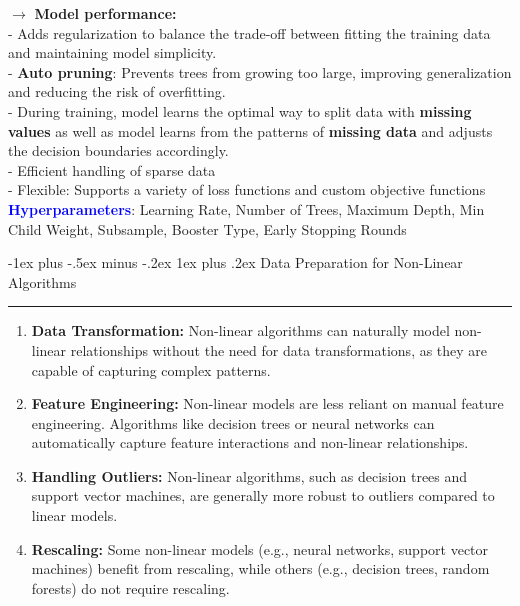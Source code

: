 \documentclass[letterpaper, 10.5pt,landscape]{article}
\makeatletter
\renewcommand{\subsubsection}{\@startsection{subsubsection}{3}{0mm}%
                                {-1ex plus -.5ex minus -.2ex}%
                                {1ex plus .2ex}%
                                {\normalfont\small\bfseries}}
\makeatother
\begin{document}
\begin{multicols*}{3}
$\rightarrow$ \textbf{Model performance: }  \\
\hspace{8pt}- Adds regularization to balance the trade-off between fitting the training data and maintaining model simplicity. \\
\hspace{8pt}- \textbf{Auto pruning}: Prevents trees from growing too large, improving generalization and reducing the risk of overfitting. \\
\hspace{8pt}- During training, model learns the optimal way to split data with \textbf{missing values} as well as model learns from the patterns of \textbf{missing data} and adjusts the decision boundaries accordingly.\\
\hspace{8pt}- Efficient handling of sparse data \\
\hspace{8pt}- Flexible: Supports a variety of loss functions and custom objective functions \\

\textbf{\textcolor{blue}{Hyperparameters}}: Learning Rate, Number of Trees, Maximum Depth, Min Child Weight, Subsample, Booster Type, Early Stopping Rounds


\subsubsection{Data Preparation for Non-Linear Algorithms} {\color{teal}\hrule height 0.5pt} \smallskip

\begin{enumerate}
    \item \textbf{Data Transformation:} 
    Non-linear algorithms can naturally model non-linear relationships without the need for data transformations, as they are capable of capturing complex patterns.

    \item \textbf{Feature Engineering:} 
    Non-linear models are less reliant on manual feature engineering. Algorithms like decision trees or neural networks can automatically capture feature interactions and non-linear relationships.

    \item \textbf{Handling Outliers:} 
    Non-linear algorithms, such as decision trees and support vector machines, are generally more robust to outliers compared to linear models.

    \item \textbf{Rescaling:} 
    Some non-linear models (e.g., neural networks, support vector machines) benefit from rescaling, while others (e.g., decision trees, random forests) do not require rescaling.


\end{enumerate}
\end{multicols*}
\end{document}
